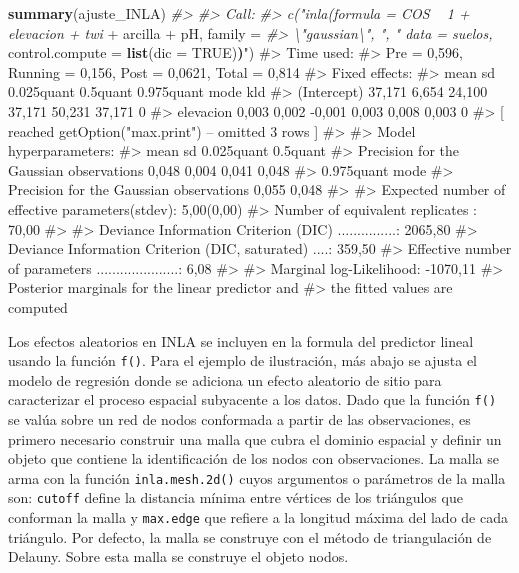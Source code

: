 \documentclass[11pt,b5paper,]{krantz}
\newenvironment{Shaded}{}{}
\newcommand{\CommentTok}[1]{\textcolor[rgb]{0.38,0.63,0.69}{\textit{#1}}}
\newcommand{\DataTypeTok}[1]{\textcolor[rgb]{0.56,0.13,0.00}{#1}}
\newcommand{\ErrorTok}[1]{\textcolor[rgb]{1.00,0.00,0.00}{\textbf{#1}}}
\newcommand{\KeywordTok}[1]{\textcolor[rgb]{0.00,0.44,0.13}{\textbf{#1}}}
\newcommand{\NormalTok}[1]{#1}
\newcommand{\OperatorTok}[1]{\textcolor[rgb]{0.40,0.40,0.40}{#1}}
\newcommand{\OtherTok}[1]{\textcolor[rgb]{0.00,0.44,0.13}{#1}}
\newcommand{\StringTok}[1]{\textcolor[rgb]{0.25,0.44,0.63}{#1}}
\begin{document}
\begin{Shaded}
\begin{Highlighting}[]
\KeywordTok{summary}\NormalTok{(ajuste_INLA)}
\CommentTok{#>}
\CommentTok{#> Call:}
\CommentTok{#> c("inla(formula = COS ~ 1 + elevacion + twi}
\OperatorTok{+}\StringTok{ }\NormalTok{arcilla }\OperatorTok{+}\StringTok{ }\NormalTok{pH, family =}
\CommentTok{#> \textbackslash{}"gaussian\textbackslash{}", ", " data = suelos,}
\NormalTok{control.compute =}\StringTok{ }\KeywordTok{list}\NormalTok{(}\DataTypeTok{dic =} \OtherTok{TRUE}\NormalTok{)}\ErrorTok{)}\StringTok{")}
\StringTok{#> Time used:}
\StringTok{#> Pre = 0,596, Running = 0,156, Post = 0,0621,}
\StringTok{Total = 0,814}
\StringTok{#> Fixed effects:}
\StringTok{#> mean sd 0.025quant 0.5quant 0.975quant mode}
\StringTok{kld}
\StringTok{#> (Intercept) 37,171 6,654 24,100 37,171}
\StringTok{50,231 37,171 0}
\StringTok{#> elevacion 0,003 0,002 -0,001 0,003 0,008}
\StringTok{0,003 0}
\StringTok{#> [ reached getOption("}\NormalTok{max.print}\StringTok{") -- omitted}
\StringTok{3 rows ]}
\StringTok{#>}
\StringTok{#> Model hyperparameters:}
\StringTok{#> mean sd 0.025quant 0.5quant}
\StringTok{#> Precision for the Gaussian observations}
\StringTok{0,048 0,004 0,041 0,048}
\StringTok{#> 0.975quant mode}
\StringTok{#> Precision for the Gaussian observations}
\StringTok{0,055 0,048}
\StringTok{#>}
\StringTok{#> Expected number of effective}
\StringTok{parameters(stdev): 5,00(0,00)}
\StringTok{#> Number of equivalent replicates : 70,00}
\StringTok{#>}
\StringTok{#> Deviance Information Criterion (DIC)}
\StringTok{...............: 2065,80}
\StringTok{#> Deviance Information Criterion (DIC,}
\StringTok{saturated) ....: 359,50}
\StringTok{#> Effective number of parameters}
\StringTok{.....................: 6,08}
\StringTok{#>}
\StringTok{#> Marginal log-Likelihood: -1070,11}
\StringTok{#> Posterior marginals for the linear predictor}
\StringTok{and}
\StringTok{#> the fitted values are computed}
\end{Highlighting}
\end{Shaded}

Los efectos aleatorios en INLA se incluyen en la formula del predictor lineal usando la función \texttt{f()}. Para el ejemplo de ilustración, más abajo se ajusta el modelo de regresión donde se adiciona un efecto aleatorio de sitio para caracterizar el proceso espacial subyacente a los datos. Dado que la función \texttt{f()} se valúa sobre un red de nodos conformada a partir de las observaciones, es primero necesario construir una malla que cubra el dominio espacial y definir un objeto que contiene la identificación de los nodos con observaciones. La malla se arma con la función \texttt{inla.mesh.2d()} cuyos argumentos o parámetros de la malla son: \texttt{cutoff} define la distancia mínima entre vértices de los triángulos que conforman la malla y \texttt{max.edge} que refiere a la longitud máxima del lado de cada triángulo. Por defecto, la malla se construye con el método de triangulación de Delauny. Sobre esta malla se construye el objeto nodos.
\end{document}
